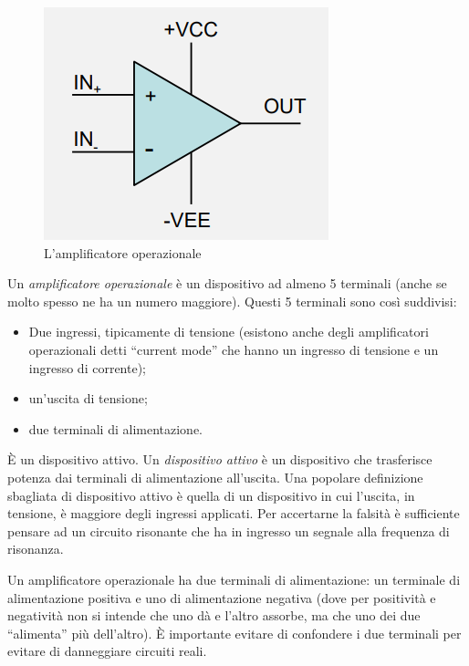 \documentclass{article}
\begin{document}
\begin{figure}[h]
  \centering
  \includegraphics[scale=0.7]{IM_amplificatore_operazionale}
  \caption{L'amplificatore operazionale}
  \label{Schema_amplificatore_operazionale}
\end{figure}

Un \textit{amplificatore operazionale} è un dispositivo ad almeno 5 terminali (anche se molto spesso ne ha un numero maggiore). Questi 5 terminali sono così suddivisi:
\begin{itemize}
  \item Due ingressi, tipicamente di tensione (esistono anche degli amplificatori operazionali detti ``current mode'' che hanno un ingresso di tensione e un ingresso di corrente);
  \item un'uscita di tensione;
  \item  due terminali di alimentazione.
\end{itemize}

\vspace{3mm}

È un dispositivo attivo. Un \textit{dispositivo attivo} è un dispositivo che trasferisce potenza dai terminali di alimentazione all'uscita. Una popolare definizione sbagliata di dispositivo attivo è quella di un dispositivo in cui l'uscita, in tensione, è maggiore degli ingressi applicati. Per accertarne la falsità è sufficiente pensare ad un circuito risonante che ha in ingresso un segnale alla frequenza di risonanza.

\vspace{3mm}

Un amplificatore operazionale ha due terminali di alimentazione: un terminale di alimentazione positiva e uno di alimentazione negativa (dove per positività e negatività non si intende che uno dà e l'altro assorbe, ma che uno dei due ``alimenta'' più dell'altro). È importante evitare di confondere i due terminali per evitare di danneggiare circuiti reali.
\end{document}
